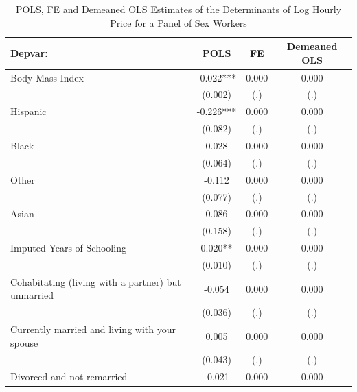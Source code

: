 \documentclass{beamer}
\begin{document}
\begin{frame}[plain]
\begin{table}[htbp]\centering
\tiny
\caption{POLS, FE and Demeaned OLS Estimates of the Determinants of Log Hourly Price for a Panel of Sex Workers}
\label{sasp}
\begin{center}
\begin{threeparttable}
\begin{tabular}{l*{3}{c}}
\toprule
\multicolumn{1}{l}{\textbf{Depvar:}}&
\multicolumn{1}{c}{\textbf{POLS}}&
\multicolumn{1}{c}{\textbf{FE}}&
\multicolumn{1}{c}{\textbf{Demeaned OLS}}\\
\midrule
Body Mass Index     									&      -0.022***&       0.000   &       0.000 \\
                    									&     (0.002)   &         (.)   &         (.) \\
Hispanic   									&      -0.226***&       0.000   &       0.000 \\
                    									&     (0.082)   &         (.)   &         (.) \\
Black      									&       0.028   &       0.000   &       0.000 \\
                    									&     (0.064)   &         (.)   &         (.) \\
 Other      									&      -0.112   &       0.000   &       0.000 \\
                    									&     (0.077)   &         (.)   &         (.) \\
 Asian      									&       0.086   &       0.000   &       0.000 \\
                    									&     (0.158)   &         (.)   &         (.) \\
Imputed Years of Schooling								&       0.020** &       0.000   &       0.000 \\
                   	 									&     (0.010)   &         (.)   &         (.) \\
Cohabitating (living with a partner) but unmarried	&      -0.054   &       0.000   &       0.000 \\
                    									&     (0.036)   &         (.)   &         (.) \\
Currently married and living with your spouse		&       0.005   &       0.000   &       0.000 \\
                    									&     (0.043)   &         (.)   &         (.) \\
Divorced and not remarried							&      -0.021   &       0.000   &       0.000 \\

\end{tabular}
\end{threeparttable}
\end{center}
\end{table}
\end{frame}
\end{document}
